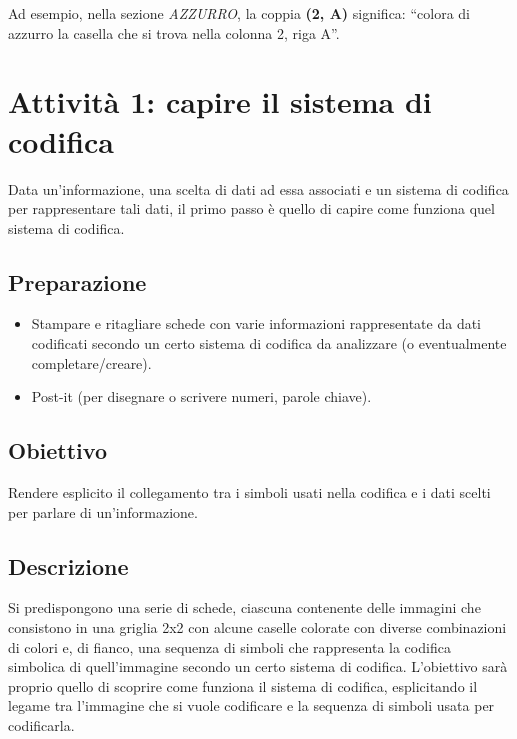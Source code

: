 Ad esempio, nella sezione \emph{AZZURRO}, la coppia \textbf{(2, A)} significa: ``colora di azzurro la casella che si trova nella colonna 2, riga A''.

\section{Attività 1: capire il sistema di codifica}

\ruoliattivita{\ruoloProgrammatore\quad\ruoloEsecutore}

Data un'informazione, una scelta di dati ad essa associati e un sistema di codifica per rappresentare tali dati, il primo passo è quello di capire come funziona quel sistema di codifica.

\subsection{Preparazione }\label{preparazione-4}

\begin{itemize}
\item
  Stampare e ritagliare schede con varie informazioni rappresentate da dati codificati secondo un certo sistema di codifica da analizzare (o eventualmente completare/creare).
\item
  Post-it (per disegnare o scrivere numeri, parole chiave).
\end{itemize}

\subsection{Obiettivo }\label{obiettivo-4}


Rendere esplicito il collegamento tra i simboli usati nella codifica e i dati scelti per parlare di un'informazione.

\subsection{Descrizione}


Si predispongono una serie di schede, ciascuna contenente delle immagini che consistono in una griglia 2x2 con alcune caselle colorate con diverse combinazioni di colori e, di fianco, una sequenza di simboli che rappresenta la codifica simbolica di quell'immagine secondo un certo sistema di codifica. L'obiettivo sarà proprio quello di scoprire come funziona il sistema di codifica, esplicitando il legame tra l'immagine che si vuole codificare e la sequenza di simboli usata per codificarla.

